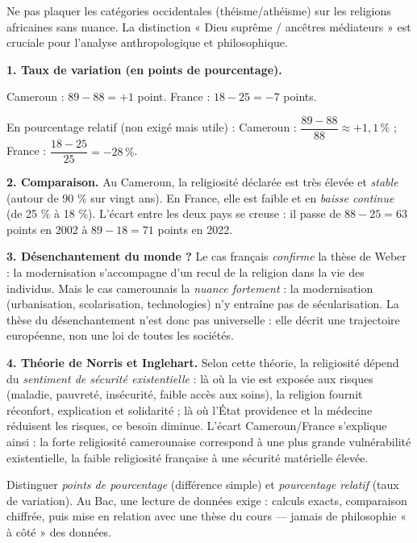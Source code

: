 \documentclass[11pt]{article}
\begin{document}
\begin{attention}
Ne pas plaquer les catégories occidentales (théisme/athéisme) sur les religions africaines sans nuance. La distinction « Dieu suprême / ancêtres médiateurs » est cruciale pour l'analyse anthropologique et philosophique.
\end{attention}

\begin{corrige}

\textbf{1. Taux de variation (en points de pourcentage).}

Cameroun : $89 - 88 = +1$ point. France : $18 - 25 = -7$ points.

En pourcentage relatif (non exigé mais utile) : Cameroun : $\dfrac{89-88}{88} \approx +1,1\,\%$ ; France : $\dfrac{18-25}{25} = -28\,\%$.

\textbf{2. Comparaison.} Au Cameroun, la religiosité déclarée est très élevée et \emph{stable} (autour de 90 \% sur vingt ans). En France, elle est faible et en \emph{baisse continue} (de 25 \% à 18 \%). L'écart entre les deux pays se creuse : il passe de $88-25=63$ points en 2002 à $89-18=71$ points en 2022.

\textbf{3. Désenchantement du monde ?} Le cas français \emph{confirme} la thèse de Weber : la modernisation s'accompagne d'un recul de la religion dans la vie des individus. Mais le cas camerounais la \emph{nuance fortement} : la modernisation (urbanisation, scolarisation, technologies) n'y entraîne pas de sécularisation. La thèse du désenchantement n'est donc pas universelle : elle décrit une trajectoire européenne, non une loi de toutes les sociétés.

\textbf{4. Théorie de Norris et Inglehart.} Selon cette théorie, la religiosité dépend du \emph{sentiment de sécurité existentielle} : là où la vie est exposée aux risques (maladie, pauvreté, insécurité, faible accès aux soins), la religion fournit réconfort, explication et solidarité ; là où l'État providence et la médecine réduisent les risques, ce besoin diminue. L'écart Cameroun/France s'explique ainsi : la forte religiosité camerounaise correspond à une plus grande vulnérabilité existentielle, la faible religiosité française à une sécurité matérielle élevée.
\end{corrige}
\begin{attention}
Distinguer \emph{points de pourcentage} (différence simple) et \emph{pourcentage relatif} (taux de variation). Au Bac, une lecture de données exige : calculs exacts, comparaison chiffrée, puis mise en relation avec une thèse du cours — jamais de philosophie « à côté » des données.
\end{attention}
\end{document}
